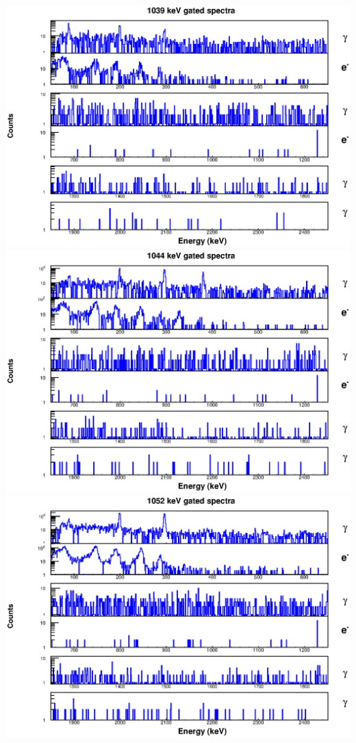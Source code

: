 \includegraphics[scale=0.8]{156Gd_Appendix/1039_combined.eps}
\includegraphics[scale=0.8]{156Gd_Appendix/1044_combined.eps}
\includegraphics[scale=0.8]{156Gd_Appendix/1052_combined.eps}
